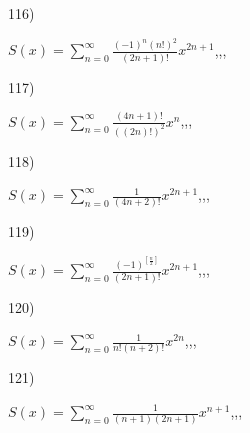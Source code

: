 \documentclass[11pt, ukrainian]{article}
\begin{document}
\par
\vspace{0.9cm}
116) \space 
{%
{$S(x)=\sum\limits_{n=0}^{\infty}{\frac{{(-1)^n}{(n!)^2}}{(2n+1)!}}{x^{{2n+1}}}$},,, \par \smallskip  
}
\par
\vspace{0.9cm}
117) \space 
{%
{$S(x)=\sum\limits_{n=0}^{\infty}{\frac{(4n+1)!}{((2n)!)^2}}{x^{{n}}}$},,, \par \smallskip  
}
\par
\vspace{0.9cm}
118) \space 
{%
{$S(x)=\sum\limits_{n=0}^{\infty}{\frac{1}{(4n+2)!}}{x^{{2n+1}}}$},,, \par \smallskip  
}
\par
\vspace{0.9cm}
119) \space 
{%
{$S(x)=\sum\limits_{n=0}^{\infty}{\frac{(-1)^{[\frac{n}{2}]}}{(2n+1)!}}{x^{{2n+1}}}$},,, \par \smallskip  
}
\par
\vspace{0.9cm}
120) \space 
{%
{$S(x)=\sum\limits_{n=0}^{\infty}{\frac{1}{n!(n+2)!}}{x^{{2n}}}$},,, \par \smallskip  
}
\par
\newpage
121) \space 
{%
{$S(x)=\sum\limits_{n=0}^{\infty}{\frac{1}{(n+1)(2n+1)}}{x^{{n+1}}}$},,, \par \smallskip  
}
\end{document}
